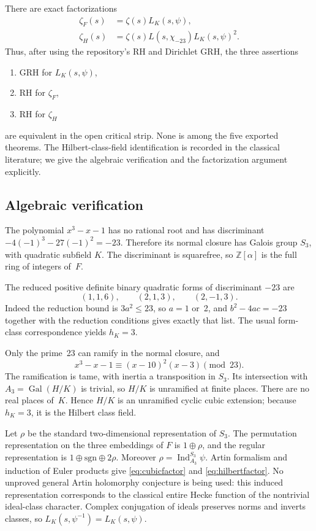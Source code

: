 \documentclass[11pt,letterpaper]{article}
\theoremstyle{definition}\newtheorem{definition}[theorem]{Definition}
\theoremstyle{remark}\newtheorem{remark}[theorem]{Remark}
\newcommand{\Z}{\mathbb Z}\newcommand{\N}{\mathbb N}
\newcommand{\Gal}{\operatorname{Gal}}\newcommand{\Cl}{\operatorname{Cl}}
\begin{document}
There are exact factorizations
\begin{align}
 \zeta_F(s)&=\zeta(s)L_K(s,\psi),\label{eq:cubicfactor}\\
 \zeta_H(s)&=\zeta(s)L(s,\chi_{-23})L_K(s,\psi)^2.\label{eq:hilbertfactor}
\end{align}
Thus, after using the repository's RH and Dirichlet GRH, the three assertions
\begin{enumerate}
\item GRH for $L_K(s,\psi)$,
\item RH for $\zeta_F$,
\item RH for $\zeta_H$
\end{enumerate}
are equivalent in the open critical strip. None is among the five exported theorems.
The Hilbert-class-field identification is recorded in the classical literature; we give
the algebraic verification and the factorization argument explicitly.\cite{morishita}

\subsection{Algebraic verification}
The polynomial $x^3-x-1$ has no rational root and has discriminant
$-4(-1)^3-27(-1)^2=-23$. Therefore its normal closure has Galois group $S_3$, with
quadratic subfield $K$. The discriminant is squarefree, so $\Z[\alpha]$ is the full ring
of integers of~$F$.

The reduced positive definite binary quadratic forms of discriminant $-23$ are
\[
 (1,1,6),\qquad (2,1,3),\qquad (2,-1,3).
\]
Indeed the reduction bound is $3a^2\le23$, so $a=1$ or~2, and
$b^2-4ac=-23$ together with the reduction conditions gives exactly that list.
The usual form-class correspondence yields $h_K=3$.

Only the prime~23 can ramify in the normal closure, and
\[
 x^3-x-1\equiv(x-10)^2(x-3)\pmod{23}.
\]
The ramification is tame, with inertia a transposition in $S_3$.
Its intersection with $A_3=\Gal(H/K)$ is trivial, so $H/K$ is unramified at finite
places. There are no real places of~$K$. Hence $H/K$ is an unramified cyclic cubic
extension; because $h_K=3$, it is the Hilbert class field.

Let $\rho$ be the standard two-dimensional representation of $S_3$.
The permutation representation on the three embeddings of $F$ is $1\oplus\rho$, and
the regular representation is $1\oplus\mathrm{sgn}\oplus2\rho$.
Moreover $\rho=\operatorname{Ind}_{A_3}^{S_3}\psi$.
Artin formalism and induction of Euler products give \eqref{eq:cubicfactor} and
\eqref{eq:hilbertfactor}. No unproved general Artin holomorphy conjecture is being used:
this induced representation corresponds to the classical entire Hecke function of the
nontrivial ideal-class character. Complex conjugation of ideals preserves norms and inverts
classes, so $L_K(s,\psi^{-1})=L_K(s,\psi)$.
\end{document}
